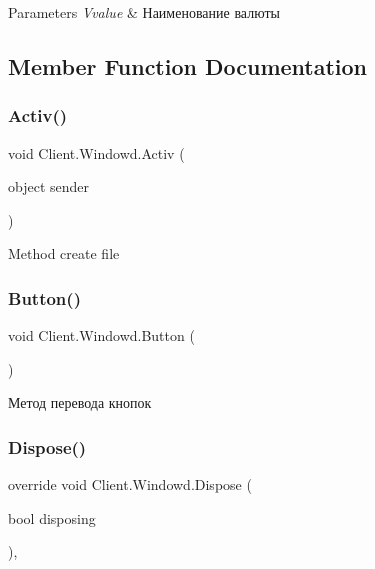 \begin{DoxyParams}{Parameters}
{\em  Vvalue} & Наименование валюты\\
\hline
\end{DoxyParams}


\subsection{Member Function Documentation}
\hypertarget{class_client_1_1_windowd_a318f722574a5396b688223fcec6e080c}{}\label{class_client_1_1_windowd_a318f722574a5396b688223fcec6e080c} 
\subsubsection{\texorpdfstring{Activ()}{Activ()}}
{\footnotesize\ttfamily void Client.\+Windowd.\+Activ (\begin{DoxyParamCaption}\item[{object}]{sender }\end{DoxyParamCaption})\hspace{0.3cm}{\ttfamily [inline]}}



Method create file 

\hypertarget{class_client_1_1_windowd_a081f7fdb62ef1cefe2ce4dacc45eb41b}{}\label{class_client_1_1_windowd_a081f7fdb62ef1cefe2ce4dacc45eb41b} 
\subsubsection{\texorpdfstring{Button()}{Button()}}
{\footnotesize\ttfamily void Client.\+Windowd.\+Button (\begin{DoxyParamCaption}{ }\end{DoxyParamCaption})\hspace{0.3cm}{\ttfamily [inline]}}



Метод перевода кнопок 

\hypertarget{class_client_1_1_windowd_ae3b81759148b68ad5f55e959567b5aab}{}\label{class_client_1_1_windowd_ae3b81759148b68ad5f55e959567b5aab} 
\subsubsection{\texorpdfstring{Dispose()}{Dispose()}}
{\footnotesize\ttfamily override void Client.\+Windowd.\+Dispose (\begin{DoxyParamCaption}\item[{bool}]{disposing }\end{DoxyParamCaption})\hspace{0.3cm}{\ttfamily [inline]}, {\ttfamily [protected]}}



